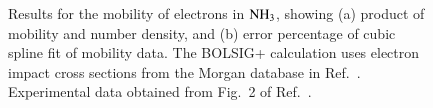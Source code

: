\documentclass{warpdoc}
\let\citen\cite
\begin{document}
%
\begin{figure}
\centering
{}
\caption{Results for the mobility of electrons in ${\rm NH_3}$, showing (a) product of mobility and number density, and (b) error percentage of cubic spline fit of  mobility data. The BOLSIG+ calculation uses electron impact cross sections from the Morgan database in Ref.\ \citen{jcp:2012:morgan}. Experimental data obtained from Fig.\ 2 of Ref.\ \citen{jopd:2005:lisovskiy}.}
\label{fig:mobility_NH3}
\end{figure}
\end{document}
